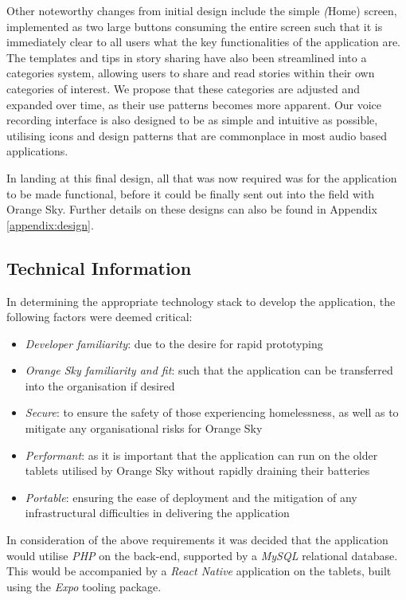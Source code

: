 Other noteworthy changes from initial design include the simple \emph(Home) screen, implemented as two large buttons consuming the entire screen such that it is immediately clear to all users what the key functionalities of the application are. The templates and tips in story sharing have also been streamlined into a categories system, allowing users to share and read stories within their own categories of interest. We propose that these categories are adjusted and expanded over time, as their use patterns becomes more apparent. Our voice recording interface is also designed to be as simple and intuitive as possible, utilising icons and design patterns that are commonplace in most audio based applications.

In landing at this final design, all that was now required was for the application to be made functional, before it could be finally sent out into the field with Orange Sky. Further details on these designs can also be found in Appendix \ref{appendix:design}.

\subsection{Technical Information}

In determining the appropriate technology stack to develop the application, the following factors were deemed critical:

\begin{itemize}
    \item \emph{Developer familiarity}: due to the desire for rapid prototyping
    \item \emph{Orange Sky familiarity and fit}: such that the application can be transferred into the organisation if desired
    \item \emph{Secure}: to ensure the safety of those experiencing homelessness, as well as to mitigate any organisational risks for Orange Sky
    \item \emph{Performant}: as it is important that the application can run on the older tablets utilised by Orange Sky without rapidly draining their batteries
    \item \emph{Portable}: ensuring the ease of deployment and the mitigation of any infrastructural difficulties in delivering the application
\end{itemize}

In consideration of the above requirements it was decided that the application would utilise \emph{PHP} on the back-end, supported by a \emph{MySQL} relational database. This would be accompanied by a \emph{React Native} application on the tablets, built using the \emph{Expo} tooling package.

